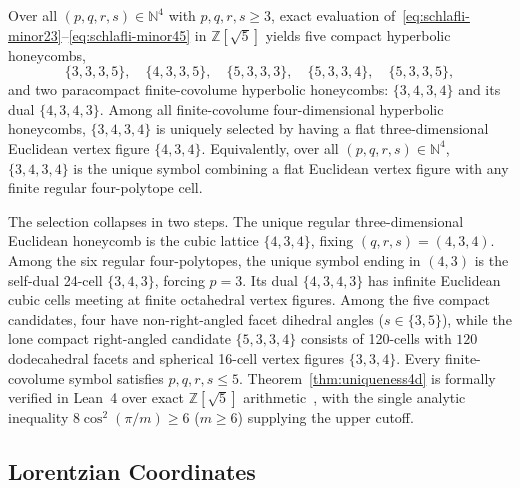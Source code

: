 \begin{theorem}
\label{thm:uniqueness4d}
Over all $(p,q,r,s) \in \mathbb{N}^4$ with $p,q,r,s \ge 3$, exact evaluation of~\eqref{eq:schlafli-minor23}--\eqref{eq:schlafli-minor45} in $\mathbb{Z}[\sqrt{5}]$ yields five compact hyperbolic honeycombs,
\begin{equation}
\{3,3,3,5\},\quad \{4,3,3,5\},\quad \{5,3,3,3\},\quad \{5,3,3,4\},\quad \{5,3,3,5\},
\end{equation}
and two paracompact finite-covolume hyperbolic honeycombs: $\{3,4,3,4\}$ and its dual $\{4,3,4,3\}$. Among all finite-covolume four-dimensional hyperbolic honeycombs, $\{3,4,3,4\}$ is uniquely selected by having a flat three-dimensional Euclidean vertex figure $\{4,3,4\}$. Equivalently, over all $(p,q,r,s) \in \mathbb{N}^4$, $\{3,4,3,4\}$ is the unique symbol combining a flat Euclidean vertex figure with any finite regular four-polytope cell.
\end{theorem}

The selection collapses in two steps. The unique regular three-dimensional Euclidean honeycomb is the cubic lattice $\{4,3,4\}$, fixing $(q,r,s) = (4,3,4)$. Among the six regular four-polytopes, the unique symbol ending in $(4,3)$ is the self-dual 24-cell $\{3,4,3\}$, forcing $p = 3$. Its dual $\{4,3,4,3\}$ has infinite Euclidean cubic cells meeting at finite octahedral vertex figures. Among the five compact candidates, four have non-right-angled facet dihedral angles ($s \in \{3,5\}$), while the lone compact right-angled candidate $\{5,3,3,4\}$ consists of 120-cells with $120$ dodecahedral facets and spherical 16-cell vertex figures $\{3,3,4\}$. Every finite-covolume symbol satisfies $p,q,r,s \le 5$. Theorem~\ref{thm:uniqueness4d} is formally verified in Lean~4 over exact $\mathbb{Z}[\sqrt{5}]$ arithmetic~\cite{pollard2026repo}, with the single analytic inequality $8\cos^2(\pi/m) \ge 6$ ($m \ge 6$) supplying the upper cutoff.

\subsection{Lorentzian Coordinates}
\label{subsec:lorentzian}

